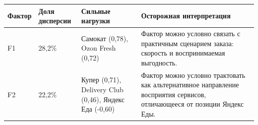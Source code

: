 {\small
\setlength{\tabcolsep}{3.0pt}
\renewcommand{\arraystretch}{1.18}
\begin{tabular}{L{2.1cm}C{2.0cm}L{4.1cm}L{6.0cm}}
\toprule
Фактор & Доля дисперсии & Сильные нагрузки & Осторожная интерпретация \\
\midrule
F1 & 28{,}2\% & Самокат (0{,}78), Ozon Fresh (0{,}72) & Фактор можно условно связать с практичным сценарием заказа: скорость и воспринимаемая выгодность. \\
F2 & 22{,}2\% & Купер (0{,}71), Delivery Club (0{,}46), Яндекс Еда (-0{,}60) & Фактор можно условно трактовать как альтернативное направление восприятия сервисов, отличающееся от позиции Яндекс Еды. \\
\bottomrule
\end{tabular}}